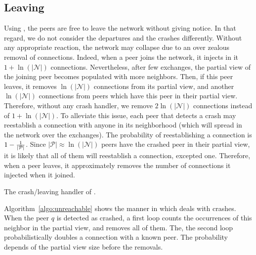 \subsection{Leaving}
\label{subsec:leaving}

Using \SPRAY{}, the peers are free to leave the network without giving
notice. In that regard, we do not consider the departures and the crashes
differently.  Without any appropriate reaction, the network may collapse due to
an over zealous removal of connections. Indeed, when a peer joins the network,
it injects in it $1+\ln(|\mathcal{N}|)$ connections. Nevertheless, after few
exchanges, the partial view of the joining peer becomes populated with more
neighbors. Then, if this peer leaves, it removes $\ln(|\mathcal{N}|)$
connections from its partial view, and another $\ln(|\mathcal{N}|)$ connections
from peers which have this peer in their partial view. Therefore, without any
crash handler, we remove $2\ln(|\mathcal{N}|)$ connections instead of
$1+\ln(|\mathcal{N}|)$. To alleviate this issue, each peer that detects a crash
may reestablish a connection with anyone in its neighborhood (which will spread
in the network over the exchanges). The probability of reestablishing a
connection is $1-{1\over{|\mathcal{P}|}}$. Since
${|\mathcal{P}|}\approx \ln(|\mathcal{N}|)$ peers have the crashed peer in
their partial view, it is likely that all of them will reestablish a
connection, excepted one. Therefore, when a peer leaves, it approximately
removes the number of connections it injected when it joined.

\begin{algorithm}[h]
  
  \caption{\label{algo:unreachable}The crash/leaving handler of \SPRAY{}.}
\end{algorithm}

Algorithm~\ref{algo:unreachable} shows the manner in which \SPRAY{} deals
with crashes. When the peer $q$ is detected as crashed, a first loop counts the
occurrences of this neighbor in the partial view, and removes all of them. The,
the second loop probabilistically doubles a connection with a known peer. The
probability depends of the partial view size before the removals.

